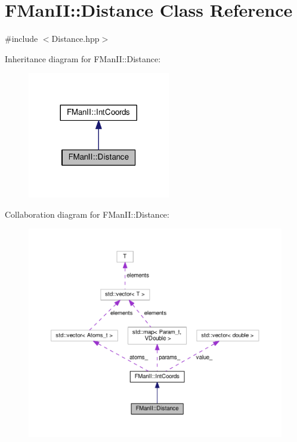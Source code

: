 \hypertarget{classFManII_1_1Distance}{}\section{F\+Man\+II\+:\+:Distance Class Reference}
\label{classFManII_1_1Distance}


{\ttfamily \#include $<$Distance.\+hpp$>$}



Inheritance diagram for F\+Man\+II\+:\+:Distance\+:\nopagebreak
\begin{figure}[H]
\begin{center}
\leavevmode
\includegraphics[width=176pt]{classFManII_1_1Distance__inherit__graph}
\end{center}
\end{figure}


Collaboration diagram for F\+Man\+II\+:\+:Distance\+:\nopagebreak
\begin{figure}[H]
\begin{center}
\leavevmode
\includegraphics[width=350pt]{classFManII_1_1Distance__coll__graph}
\end{center}
\end{figure}

